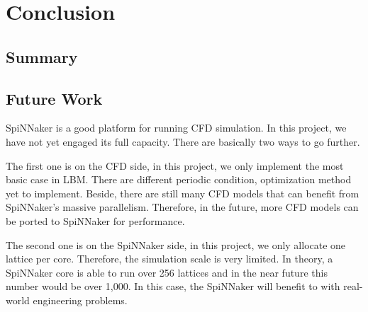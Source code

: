 \section{Conclusion} \label{sec:conclusion}
\subsection{Summary} \label{sec:summary}








\subsection{Future Work} \label{sec:future_work}
SpiNNaker is a good platform for running CFD simulation. In this project, we have not yet engaged its full capacity. There are basically two ways to go further.

The first one is on the CFD side, in this project, we only implement the most basic case in LBM. There are different periodic condition, optimization method yet to implement. Beside, there are still many CFD models that can benefit from SpiNNaker's massive parallelism. Therefore, in the future, more CFD models can be ported to SpiNNaker for performance. 

The second one is on the SpiNNaker side, in this project, we only allocate one lattice per core. Therefore, the simulation scale is very limited. In theory, a SpiNNaker core is able to run over 256 lattices and in the near future this number would be over 1,000. In this case, the SpiNNaker will benefit to with real-world engineering problems.




